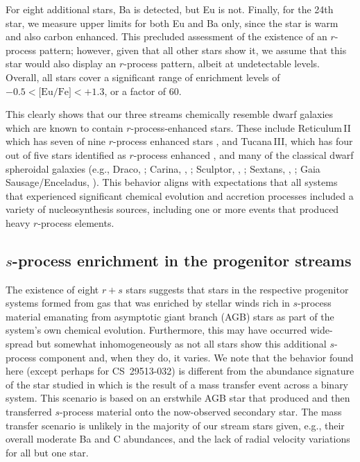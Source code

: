 \documentclass[twocolumn]{aastex63}
\begin{document}
For eight additional stars, Ba is detected, but Eu is not.
Finally, for the 24th star, we measure upper limits for both Eu and Ba only, since the star is warm and also carbon enhanced. This precluded assessment of the existence of an $r$-process pattern; however, given that all other stars show it, we assume that this star would also display an $r$-process pattern, albeit at undetectable levels.
Overall, all stars cover a significant range of enrichment levels of $-0.5 < \mbox{[Eu/Fe]} < +1.3$, or a factor of 60.

This clearly shows that our three streams chemically resemble dwarf galaxies which are known to contain $r$-process-enhanced stars.
These include Reticulum\,II which has seven of nine $r$-process enhanced stars \citep{Ji16a}, and Tucana\,III, which has four out of five stars identified as $r$-process enhanced \citep{hansen17, marshall19}, and many of the classical dwarf spheroidal galaxies (e.g., Draco, \citealt{Cohen09}; Carina, \citealt{Venn12}, \citealt{Shetrone03}; Sculptor, \citealt{Simon15}, \citealt{Jablonka15}; Sextans, \citealt{Shetrone01}, \citealt{Tafelmeyer10}; Gaia Sausage/Enceladus, \citealt{aguado21}).
This behavior aligns with expectations that all systems that experienced significant chemical evolution and accretion processes  included a variety of nucleosynthesis sources, including one or more events that produced heavy $r$-process elements.



\subsection{$s$-process enrichment in the progenitor streams} \label{sproc}

The existence of eight $r+s$ stars suggests that stars in the respective progenitor systems formed from gas that was enriched by stellar winds rich in $s$-process material emanating from asymptotic giant branch (AGB) stars \citep{Karakas10} as part of the system's own chemical evolution. Furthermore, this may have occurred wide-spread but somewhat inhomogeneously as not all stars show this additional $s$-process component and, when they do, it varies. We note that the behavior found here (except perhaps for \mbox{CS~29513-032}) is different from the abundance signature of the star studied in \citet{gull18} which is the result of a mass transfer event across a binary system. This scenario is based on an erstwhile AGB star that produced and then transferred $s$-process material onto the now-observed secondary star. The mass transfer scenario is unlikely in the majority of our stream stars given, e.g., their overall moderate Ba and C abundances, and the lack of radial velocity variations for all but one star. 
\end{document}
